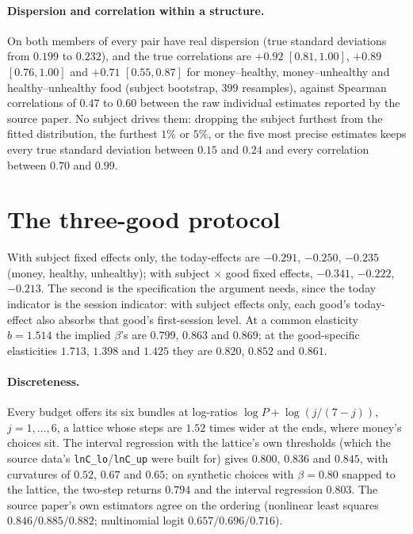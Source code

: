 \documentclass[11pt,a4paper]{article}
\theoremstyle{plain}
\theoremstyle{definition}
\begin{document}
\paragraph{Dispersion and correlation within a structure.} On \citet{cheung2022} both members of every pair have real
dispersion (true standard deviations from $0.199$ to $0.232$), and the true correlations are $+0.92$ $[0.81,1.00]$,
$+0.89$ $[0.76,1.00]$ and $+0.71$ $[0.55,0.87]$ for money--healthy, money--unhealthy and healthy--unhealthy food
(subject bootstrap, $399$ resamples), against Spearman correlations of $0.47$ to $0.60$ between the raw individual
estimates reported by the source paper. No subject drives them: dropping the subject furthest from the fitted
distribution, the furthest $1\%$ or $5\%$, or the five most precise estimates keeps every true standard deviation
between $0.15$ and $0.24$ and every correlation between $0.70$ and $0.99$.

\section{The three-good protocol}
\label{app:goods}

With subject fixed effects only, the today-effects are $-0.291$, $-0.250$, $-0.235$ (money, healthy, unhealthy);
with subject $\times$ good fixed effects, $-0.341$, $-0.222$, $-0.213$. The second is the specification the argument
needs, since the today indicator is the session indicator: with subject effects only, each good's today-effect also
absorbs that good's first-session level. At a common elasticity $b=1.514$ the implied $\beta$'s are $0.799$, $0.863$
and $0.869$; at the good-specific elasticities $1.713$, $1.398$ and $1.425$ they are $0.820$, $0.852$ and $0.861$.

\paragraph{Discreteness.} Every budget offers its six bundles at log-ratios $\log P+\log(j/(7-j))$, $j=1,\dots,6$, a
lattice whose steps are $1.52$ times wider at the ends, where money's choices sit. The interval regression with the
lattice's own thresholds (which the source data's \texttt{lnC\_lo}/\texttt{lnC\_up} were built for) gives $0.800$,
$0.836$ and $0.845$, with curvatures of $0.52$, $0.67$ and $0.65$; on synthetic choices with $\beta=0.80$ snapped to the
lattice, the two-step returns $0.794$ and the interval regression $0.803$. The source paper's own estimators agree on
the ordering (nonlinear least squares $0.846/0.885/0.882$; multinomial logit $0.657/0.696/0.716$).
\end{document}
